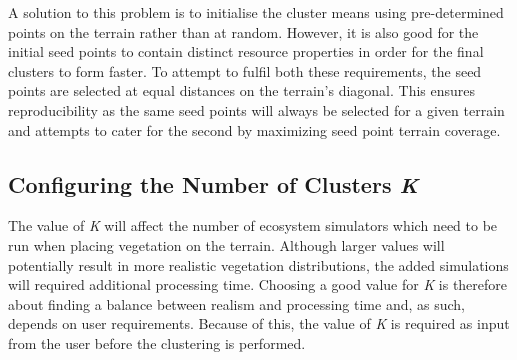 A solution to this problem is to initialise the cluster means using pre-determined points on the terrain rather than at random. However, it is also good for the initial seed points to contain distinct resource properties in order for the final clusters to form faster. To attempt to fulfil both these requirements, the seed points are selected at equal distances on the terrain's diagonal. This ensures reproducibility as the same seed points will always be selected for a given terrain and attempts to cater for the second by maximizing seed point terrain coverage. 

\subsection{Configuring the Number of Clusters \textit{K}}

The value of \textit{K} will affect the number of ecosystem simulators which need to be run when placing vegetation on the terrain. Although larger values will potentially result in more realistic vegetation distributions, the added simulations will required additional processing time. Choosing a good value for \textit{K} is therefore about finding a balance between realism and processing time and, as such, depends on user requirements. Because of this, the value of \textit{K} is required as input from the user before the clustering is performed.
